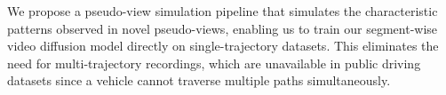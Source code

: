 





We propose a pseudo-view simulation pipeline that simulates the characteristic patterns observed in novel pseudo-views, enabling us to train our segment-wise video diffusion model directly on single-trajectory datasets. This eliminates the need for multi-trajectory recordings, which are unavailable in public driving datasets since a vehicle cannot traverse multiple paths simultaneously.

